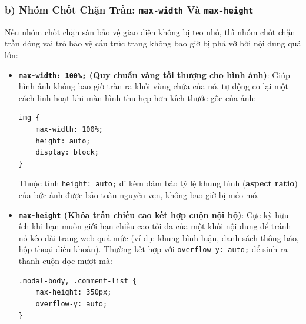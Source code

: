 \documentclass[11pt,oneside]{book}
\newcommand{\codeinline}[1]{\textcolor{accentOrange}{\texttt{#1}}}
\newcommand{\term}[1]{\textbf{\textcolor{primaryBlue}{#1}}}
\DeclareRobustCommand{\csshint}[1]{\texorpdfstring{\textcolor{accentOrange}{\textbf{\texttt{#1}}}}{#1}}
\begin{document}
\subsubsection{b) Nhóm Chốt Chặn Trần: \csshint{max-width} Và \csshint{max-height}}
\label{subsubsec:max_dimensions_ceiling}

Nếu nhóm chốt chặn sàn bảo vệ giao diện không bị teo nhỏ, thì nhóm chốt chặn trần đóng vai trò bảo vệ cấu trúc trang không bao giờ bị phá vỡ bởi nội dung quá lớn:

\begin{itemize}[leftmargin=1.5em, itemsep=5pt, parsep=0pt]
    \item \textbf{\codeinline{max-width: 100\%;} (Quy chuẩn vàng tối thượng cho hình ảnh)}:
    Giúp hình ảnh không bao giờ tràn ra khỏi vùng chứa của nó, tự động co lại một cách linh hoạt khi màn hình thu hẹp hơn kích thước gốc của ảnh:
    \begin{codeWindow}
\begin{lstlisting}[language=CSS3]
img {
    max-width: 100%;
    height: auto;
    display: block;
}
\end{lstlisting}
    \end{codeWindow}
    Thuộc tính \codeinline{height: auto;} đi kèm đảm bảo tỷ lệ khung hình (\term{aspect ratio}) của bức ảnh được bảo toàn nguyên vẹn, không bao giờ bị méo mó.

    \item \textbf{\codeinline{max-height} (Khóa trần chiều cao kết hợp cuộn nội bộ)}:
    Cực kỳ hữu ích khi bạn muốn giới hạn chiều cao tối đa của một khối nội dung để tránh nó kéo dài trang web quá mức (ví dụ: khung bình luận, danh sách thông báo, hộp thoại điều khoản). Thường kết hợp với \codeinline{overflow-y: auto;} để sinh ra thanh cuộn dọc mượt mà:
    \begin{codeWindow}
\begin{lstlisting}[language=CSS3]
.modal-body, .comment-list {
    max-height: 350px;
    overflow-y: auto;
}
\end{lstlisting}
    \end{codeWindow}
\end{itemize}
\end{document}
